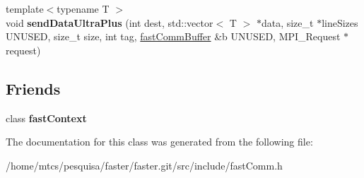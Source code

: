\begin{DoxyCompactItemize}
\item 
\hypertarget{classfaster_1_1fastComm_a2dce32a93a8a66e22d5e8caf650dd83c}{}{\footnotesize template$<$typename T $>$ }\\void {\bfseries send\+Data\+Ultra\+Plus} (int dest, std\+::vector$<$ T $>$ $\ast$data, size\+\_\+t $\ast$line\+Sizes U\+N\+U\+S\+E\+D, size\+\_\+t size, int tag, \hyperlink{classfaster_1_1fastCommBuffer}{fast\+Comm\+Buffer} \&b U\+N\+U\+S\+E\+D, M\+P\+I\+\_\+\+Request $\ast$request)\label{classfaster_1_1fastComm_a2dce32a93a8a66e22d5e8caf650dd83c}

\end{DoxyCompactItemize}
\subsection*{Friends}
\begin{DoxyCompactItemize}
\item 
\hypertarget{classfaster_1_1fastComm_a8ffe9636e25b4912700710d5fd2b5a2a}{}class {\bfseries fast\+Context}\label{classfaster_1_1fastComm_a8ffe9636e25b4912700710d5fd2b5a2a}

\end{DoxyCompactItemize}


The documentation for this class was generated from the following file\+:\begin{DoxyCompactItemize}
\item 
/home/mtcs/pesquisa/faster/faster.\+git/src/include/fast\+Comm.\+h\end{DoxyCompactItemize}
